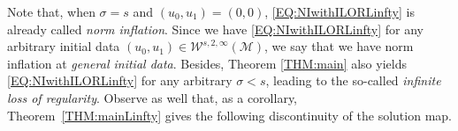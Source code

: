 \documentclass[letterpaper, 11pt,  reqno]{amsart}
\newtheorem{theorem}{Theorem} [section]
\newcommand{\1}{\hspace{0.5mm}\text{I}\hspace{0.5mm}}
\newcommand{\noi}{\noindent}
\newcommand{\M}{\mathcal{M}}
\renewcommand{\H}{\mathcal{H}}
\newcommand{\eps}{\varepsilon}
\newcommand{\s}{\sigma}
\newcommand{\dt}{\partial_t}
\newcommand{\ges}{\gtrsim}
\newcommand{\W}{\mathcal{W}}
\numberwithin{equation}{section}
\numberwithin{theorem}{section}
\begin{document}

%


Note that, when $\s =s$ and $(u_0, u_1) = (0,0)$, \eqref{EQ:NIwithILORLinfty} is already called {\it norm inflation}. Since we have \eqref{EQ:NIwithILORLinfty} for any arbitrary initial data $(u_0, u_1) \in \W^{s, 2, \infty} (\M)$, we say that we have norm inflation at {\it general initial data}. Besides, Theorem \ref{THM:main} also yields \eqref{EQ:NIwithILORLinfty} for any arbitrary $\s < s$, leading to the so-called {\it infinite loss of regularity}. Observe as well that, as a corollary, Theorem~\ref{THM:mainLinfty} gives the following discontinuity of the solution map.

\end{document}
